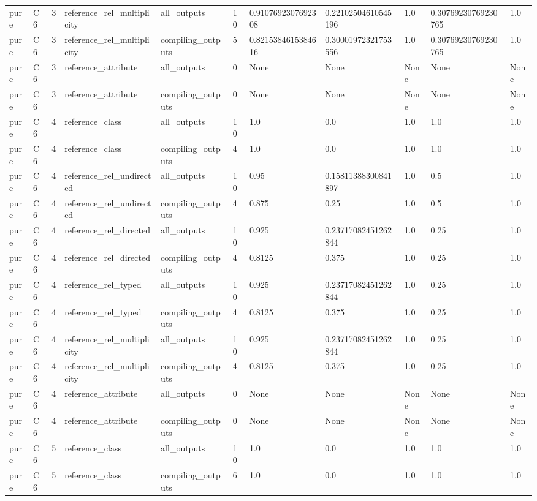 \begin{tabular}{lllllllllll}
pure & C6 & 3 & reference\_rel\_multiplicity & all\_outputs & 10 & 0.9107692307692308 & 0.22102504610545196 & 1.0 & 0.30769230769230765 & 1.0 \\
pure & C6 & 3 & reference\_rel\_multiplicity & compiling\_outputs & 5 & 0.8215384615384616 & 0.30001972321753556 & 1.0 & 0.30769230769230765 & 1.0 \\
pure & C6 & 3 & reference\_attribute & all\_outputs & 0 & None & None & None & None & None \\
pure & C6 & 3 & reference\_attribute & compiling\_outputs & 0 & None & None & None & None & None \\
pure & C6 & 4 & reference\_class & all\_outputs & 10 & 1.0 & 0.0 & 1.0 & 1.0 & 1.0 \\
pure & C6 & 4 & reference\_class & compiling\_outputs & 4 & 1.0 & 0.0 & 1.0 & 1.0 & 1.0 \\
pure & C6 & 4 & reference\_rel\_undirected & all\_outputs & 10 & 0.95 & 0.15811388300841897 & 1.0 & 0.5 & 1.0 \\
pure & C6 & 4 & reference\_rel\_undirected & compiling\_outputs & 4 & 0.875 & 0.25 & 1.0 & 0.5 & 1.0 \\
pure & C6 & 4 & reference\_rel\_directed & all\_outputs & 10 & 0.925 & 0.23717082451262844 & 1.0 & 0.25 & 1.0 \\
pure & C6 & 4 & reference\_rel\_directed & compiling\_outputs & 4 & 0.8125 & 0.375 & 1.0 & 0.25 & 1.0 \\
pure & C6 & 4 & reference\_rel\_typed & all\_outputs & 10 & 0.925 & 0.23717082451262844 & 1.0 & 0.25 & 1.0 \\
pure & C6 & 4 & reference\_rel\_typed & compiling\_outputs & 4 & 0.8125 & 0.375 & 1.0 & 0.25 & 1.0 \\
pure & C6 & 4 & reference\_rel\_multiplicity & all\_outputs & 10 & 0.925 & 0.23717082451262844 & 1.0 & 0.25 & 1.0 \\
pure & C6 & 4 & reference\_rel\_multiplicity & compiling\_outputs & 4 & 0.8125 & 0.375 & 1.0 & 0.25 & 1.0 \\
pure & C6 & 4 & reference\_attribute & all\_outputs & 0 & None & None & None & None & None \\
pure & C6 & 4 & reference\_attribute & compiling\_outputs & 0 & None & None & None & None & None \\
pure & C6 & 5 & reference\_class & all\_outputs & 10 & 1.0 & 0.0 & 1.0 & 1.0 & 1.0 \\
pure & C6 & 5 & reference\_class & compiling\_outputs & 6 & 1.0 & 0.0 & 1.0 & 1.0 & 1.0 \\

\end{tabular}
